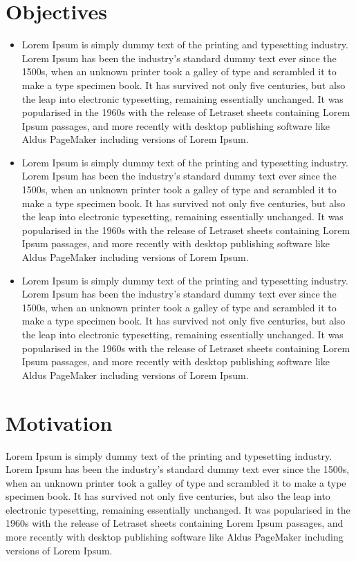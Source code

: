 \documentclass[12pt,a4paper]{report}
\begin{document}
\section{Objectives}
\begin{itemize}
\item Lorem Ipsum is simply dummy text of the printing and typesetting industry. Lorem Ipsum has been the industry's standard dummy text ever since the 1500s, when an unknown printer took a galley of type and scrambled it to make a type specimen book. It has survived not only five centuries, but also the leap into electronic typesetting, remaining essentially unchanged. It was popularised in the 1960s with the release of Letraset sheets containing Lorem Ipsum passages, and more recently with desktop publishing software like Aldus PageMaker including versions of Lorem Ipsum.
\item Lorem Ipsum is simply dummy text of the printing and typesetting industry. Lorem Ipsum has been the industry's standard dummy text ever since the 1500s, when an unknown printer took a galley of type and scrambled it to make a type specimen book. It has survived not only five centuries, but also the leap into electronic typesetting, remaining essentially unchanged. It was popularised in the 1960s with the release of Letraset sheets containing Lorem Ipsum passages, and more recently with desktop publishing software like Aldus PageMaker including versions of Lorem Ipsum.
\item Lorem Ipsum is simply dummy text of the printing and typesetting industry. Lorem Ipsum has been the industry's standard dummy text ever since the 1500s, when an unknown printer took a galley of type and scrambled it to make a type specimen book. It has survived not only five centuries, but also the leap into electronic typesetting, remaining essentially unchanged. It was popularised in the 1960s with the release of Letraset sheets containing Lorem Ipsum passages, and more recently with desktop publishing software like Aldus PageMaker including versions of Lorem Ipsum.
\end{itemize}

\section{Motivation}
Lorem Ipsum is simply dummy text of the printing and typesetting industry. Lorem Ipsum has been the industry's standard dummy text ever since the 1500s, when an unknown printer took a galley of type and scrambled it to make a type specimen book. It has survived not only five centuries, but also the leap into electronic typesetting, remaining essentially unchanged. It was popularised in the 1960s with the release of Letraset sheets containing Lorem Ipsum passages, and more recently with desktop publishing software like Aldus PageMaker including versions of Lorem Ipsum. 
\end{document}
